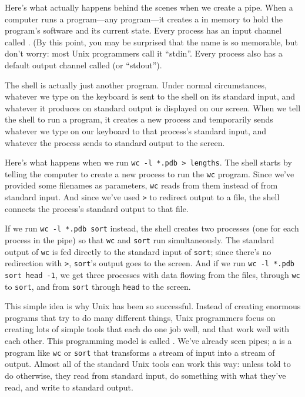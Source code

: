 Here's what actually happens behind the scenes when we create a pipe.
When a computer runs a program---any program---it creates a
 in memory to hold the program's software
and its current state. Every process has an input channel called
. (By this point, you may be
surprised that the name is so memorable, but don't worry: most Unix
programmers call it ``stdin''. Every process also has a default output
channel called  (or
``stdout'').

The shell is actually just another program. Under normal circumstances,
whatever we type on the keyboard is sent to the shell on its standard
input, and whatever it produces on standard output is displayed on our
screen. When we tell the shell to run a program, it creates a new
process and temporarily sends whatever we type on our keyboard to that
process's standard input, and whatever the process sends to standard
output to the screen.

Here's what happens when we run
\texttt{wc -l *.pdb \textgreater{} lengths}. The shell starts by telling
the computer to create a new process to run the \texttt{wc} program.
Since we've provided some filenames as parameters, \texttt{wc} reads
from them instead of from standard input. And since we've used
\texttt{\textgreater{}} to redirect output to a file, the shell connects
the process's standard output to that file.

If we run \texttt{wc -l *.pdb \textbar{} sort} instead, the shell
creates two processes (one for each process in the pipe) so that
\texttt{wc} and \texttt{sort} run simultaneously. The standard output of
\texttt{wc} is fed directly to the standard input of \texttt{sort};
since there's no redirection with \texttt{\textgreater{}},
\texttt{sort}'s output goes to the screen. And if we run
\texttt{wc -l *.pdb \textbar{} sort \textbar{} head -1}, we get three
processes with data flowing from the files, through \texttt{wc} to
\texttt{sort}, and from \texttt{sort} through \texttt{head} to the
screen.

This simple idea is why Unix has been so successful. Instead of creating
enormous programs that try to do many different things, Unix programmers
focus on creating lots of simple tools that each do one job well, and
that work well with each other. This programming model is called
. We've already seen
pipes; a  is a program like \texttt{wc} or
\texttt{sort} that transforms a stream of input into a stream of output.
Almost all of the standard Unix tools can work this way: unless told to
do otherwise, they read from standard input, do something with what
they've read, and write to standard output.

